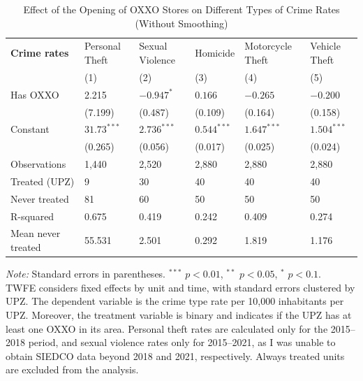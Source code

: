 \documentclass[12pt]{article}
\begin{document}
\begin{table}[H]
\centering
\caption{Effect of the Opening of OXXO Stores on Different Types of Crime Rates (Without Smoothing)}
\label{tab:resultados_regresion_no_smooth}
\small


\begin{tabularx}{\textwidth}{l C C C C C}
\hline\hline
\textbf{Crime rates} & Personal Theft & Sexual Violence & Homicide & Motorcycle Theft & Vehicle Theft \\
 & (1) & (2) & (3) & (4) & (5) \\
\hline
Has OXXO             & 2.215          & $-0.947^{*}$  & $0.166$        & $-0.265$        & $-0.200$  \\
                     & (7.199)        & (0.487)       & (0.109)        & (0.164)       & (0.158) \\
Constant             & $31.73^{***}$  & $2.736^{***}$ & $0.544^{***}$  & $1.647^{***}$ & $1.504^{***}$ \\
                     & (0.265)        & (0.056)       & (0.017)        & (0.025)       & (0.024) \\
\hline
Observations         & 1,440          & 2,520         & 2,880          & 2,880         & 2,880 \\
Treated (UPZ)        & 9              & 30            & 40             & 40            & 40 \\
Never treated        & 81             & 60            & 50             & 50            & 50 \\
R-squared            & 0.675          & 0.419         & 0.242          & 0.409         & 0.274 \\
Mean never treated   & 55.531         & 2.501         & 0.292          & 1.819         & 1.176 \\
\hline\hline
\end{tabularx}

\vspace{0.5em}
\parbox{\textwidth}{\footnotesize
    \textit{Note:} Standard errors in parentheses. $^{***}$ $p<0.01$, $^{**}$ $p<0.05$, $^{*}$ $p<0.1$. \\
    TWFE considers fixed effects by unit and time, with standard errors clustered by UPZ. 
    The dependent variable is the crime type rate per 10,000 inhabitants per UPZ. 
    Moreover, the treatment variable is binary and indicates if the UPZ has at least one OXXO in its area. 
    Personal theft rates are calculated only for the 2015–2018 period, and sexual violence rates only for 2015–2021, as I was unable to obtain SIEDCO data beyond 2018 and 2021, respectively.
    Always treated units are excluded from the analysis.
}
\end{table}
\end{document}
